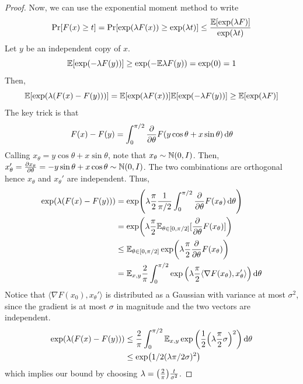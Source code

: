 \begin{theorem}
\begin{proof}
        Now, we can use the exponential moment method to write
        \[ \textrm{Pr} [F(x) \ge t] = \textrm{Pr}[\exp(\lambda F(x)) \ge \exp(\lambda t)] \le \frac{\mathbb{E}[\exp(\lambda F)]}{\exp(\lambda t)} \]
        Let $y$ be an independent copy of $x$.
        \[ \mathbb{E}[\exp(-\lambda F(y))] \ge \exp(-\mathbb{E} \lambda F(y)) = \exp(0) = 1 \]
        Then,
        \[ \mathbb{E}[\exp(\lambda(F(x) - F(y)))] = \mathbb{E}[\exp(\lambda F(x))] \mathbb{E}[\exp(-\lambda F(y))] \ge \mathbb{E}[\exp(\lambda F)] \]
        The key trick is that
        \[ F(x) - F(y) = \int_{0}^{\pi/2} \pdv{}{\theta} F(y \cos \theta + x \sin \theta) \dd{\theta} \]
        Calling $x_{\theta} = y\cos \theta + x \sin \theta$, note that $x_{\theta} \sim \operatorname{\mathbb{N}}(0, I)$.
        Then, $x_{\theta}' = \pdv{x_{\theta}}{\theta} = -y \sin \theta + x \cos \theta \sim \operatorname{\mathbb{N}}(0, I)$.
        The two combinations are orthogonal hence $x_{\theta}$ and $x_{\theta}'$ are independent.
        Thus,
        \begin{align*}
            \exp(\lambda(F(x) - F(y))) &= \exp(\lambda \frac{\pi}{2} \frac{1}{\pi/2} \int_0^{\pi/2} \pdv{}{\theta} F(x_{\theta}) \dd{\theta} ) \\
            &= \exp(\lambda \frac{\pi}{2} \mathbb{E}_{\theta \in [0, \pi/2 ]}[\pdv{}{\theta} F(x_{\theta})] ) \\
            &\le \mathbb{E}_{\theta \in [0, \pi/2]} \exp(\lambda \frac{\pi}{2} \pdv{}{\theta} F(x_{\theta})) \\
            &= \mathbb{E}_{x,y} \frac{2}{\pi} \int_{0}^{\pi/2} \exp\qty(\lambda \frac{\pi}{2} \langle \nabla F(x_{\theta}), x_{\theta}' \rangle) \dd{\theta} \\
        \end{align*}
        Notice that $\langle \nabla F(x_0), x_{\theta}' \rangle$ is distributed as a Gaussian
        with variance at most $\sigma^2$, since the gradient is at most $\sigma$ in magnitude and the two vectors are independent.
        \begin{align*}
            \exp(\lambda(F(x) - F(y))) &\le \frac{2}{\pi} \int_0^{\pi/2} \mathbb{E}_{x, y} \exp\qty(\frac{1}{2} \qty(\lambda \frac{\pi}{2} \sigma)^2) \dd{\theta} \\
            &\le \exp(1/2(\lambda \pi/2 \sigma)^2)
        \end{align*}
        which implies our bound by choosing $\lambda = \qty(\frac{2}{\pi}) \frac{t}{\sigma^2}$.
    \end{proof}
\end{theorem}

